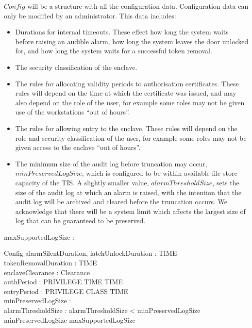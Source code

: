 $Config$ will be a structure with all the configuration data. 
Configuration data can only be modified by an administrator.
This data includes:
\begin{itemize}
\item 
Durations for internal timeouts. These effect how long the
system waits before raising an audible alarm, how long the system
leaves the door unlocked for, and how long the system waits for a
successful token removal.
\item
The security classification of the enclave.
\item
The rules for allocating validity periods to authorisation
certificates. These rules will depend on the time at which the
certificate was issued, and may also depend on the role of the user,
for example some roles may not be given use of the workstations ``out
of hours''. 
\item
The rules for allowing entry to the enclave. These rules will depend
on the role and security classification of the user, for example some
roles may not be given
access to the enclave ``out of hours''. 
\item
The minimum size of the audit
log before truncation may occur, $minPreservedLogSize$, which is configured to be within available file
store capacity of the TIS. A slightly smaller value, $alarmThresholdSize$,
sets the size of the audit log at which an alarm is raised, 
with the intention that the
audit log will be archived and cleared before the truncation occurs.
We acknowledge that there will be a system limit which affects the
largest size of log that can be guaranteed to be preserved.
\end{itemize}

\begin{axdef}
        maxSupportedLogSize : \nat
\end{axdef}


\begin{schema}{Config}
	alarmSilentDuration, latchUnlockDuration : TIME
\\      tokenRemovalDuration : TIME
\\      enclaveClearance : Clearance
\\      authPeriod : PRIVILEGE \fun TIME \fun \power TIME
\\      entryPeriod : PRIVILEGE \fun CLASS \fun \power TIME
\\      minPreservedLogSize : \nat
\\      alarmThresholdSize : \nat
\where
        alarmThresholdSize < minPreservedLogSize 
\\      minPreservedLogSize \leq maxSupportedLogSize     
\end{schema}


